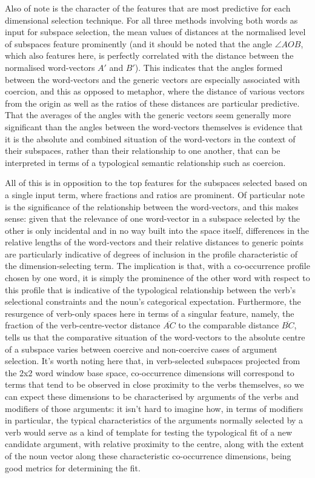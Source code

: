 Also of note is the character of the features that are most predictive for each dimensional selection technique.  For all three methods involving both words as input for subspace selection, the mean values of distances at the normalised level of subspaces feature prominently (and it should be noted that the angle $\angle AOB$, which also features here, is perfectly correlated with the distance between the normalised word-vectors $A'$ and $B'$).  This indicates that the angles formed between the word-vectors and the generic vectors are especially associated with coercion, and this as opposed to metaphor, where the distance of various vectors from the origin as well as the ratios of these distances are particular predictive.  That the averages of the angles with the generic vectors seem generally more significant than the angles between the word-vectors themselves is evidence that it is the absolute and combined situation of the word-vectors in the context of their subspaces, rather than their relationship to one another, that can be interpreted in terms of a typological semantic relationship such as coercion.

All of this is in opposition to the top features for the subspaces selected based on a single input term, where fractions and ratios are prominent.  Of particular note is the significance of the relationship between the word-vectors, and this makes sense: given that the relevance of one word-vector in a subspace selected by the other is only incidental and in no way built into the space itself, differences in the relative lengths of the word-vectors and their relative distances to generic points are particularly indicative of degrees of inclusion in the profile characteristic of the dimension-selecting term.  The implication is that, with a co-occurrence profile chosen by one word, it is simply the prominence of the other word with respect to this profile that is indicative of the typological relationship between the verb's selectional constraints and the noun's categorical expectation.  Furthermore, the resurgence of verb-only spaces here in terms of a singular feature, namely, the fraction of the verb-centre-vector distance $\overline{AC}$ to the comparable distance $\overline{BC}$, tells us that the comparative situation of the word-vectors to the absolute centre of a subspace varies between coercive and non-coercive cases of argument selection.  It's worth noting here that, in verb-selected subspaces projected from the 2x2 word window base space, co-occurrence dimensions will correspond to terms that tend to be observed in close proximity to the verbs themselves, so we can expect these dimensions to be characterised by arguments of the verbs and modifiers of those arguments: it isn't hard to imagine how, in terms of modifiers in particular, the typical characteristics of the arguments normally selected by a verb would serve as a kind of template for testing the typological fit of a new candidate argument, with relative proximity to the centre, along with the extent of the noun vector along these characteristic co-occurrence dimensions, being good metrics for determining the fit.

